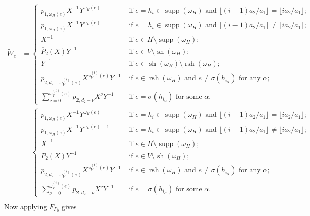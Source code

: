 \documentclass{amsart}
\newcommand{\supp}{\operatorname{supp}}
\newcommand{\rsh}{\operatorname{rsh}}
\newcommand{\sh}{\operatorname{sh}}
\begin{document}
\begin{align*}
 \tilde W_e
 &=\begin{cases}p_{1,\omega_H(e)}X^{-1}Y^{\omega_H(e)} & \text{ if $e=h_i\in\supp(\omega_H)$ and $\lfloor (i-1)a_2/a_1\rfloor=\lfloor ia_2/a_1\rfloor$;}\\ p_{1,\omega_H(e)}X^{-1}Y^{\omega_H(e)} & \text{ if $e=h_i\in\supp(\omega_H)$ and $\lfloor (i-1)a_2/a_1\rfloor\ne\lfloor ia_2/a_1\rfloor$;}\\ X^{-1} & \text{ if $e\in H\setminus\supp(\omega_H)$;}\\ \overline{P}_2(X)Y^{-1} & \text{ if $e\in V\setminus\sh(\omega_H);$}\\ Y^{-1} & \text{ if $e\in\sh(\omega_H)\setminus\rsh(\omega_H)$;}\\ p_{2,d_2-\omega_V^{(t)}(e)}X^{\omega_V^{(t)}(e)}Y^{-1} & \text{ if $e\in\rsh(\omega_H)$ and $e\ne\sigma(h_{i_\alpha})$ for any $\alpha$;}\\ \sum\limits_{\nu=0}^{\omega_V^{(t)}(e)}p_{2,d_2-\nu}X^\nu Y^{-1} & \text{ if $e=\sigma(h_{i_\alpha})$ for some $\alpha$.}\end{cases}\\
 &=\begin{cases}p_{1,\omega_H(e)}X^{-1}Y^{\omega_H(e)} & \text{ if $e=h_i\in\supp(\omega_H)$ and $\lfloor (i-1)a_2/a_1\rfloor=\lfloor ia_2/a_1\rfloor$;}\\ p_{1,\omega_H(e)}X^{-1}Y^{\omega_H(e)-1} & \text{ if $e=h_i\in\supp(\omega_H)$ and $\lfloor (i-1)a_2/a_1\rfloor\ne\lfloor ia_2/a_1\rfloor$;}\\ X^{-1} & \text{ if $e\in H\setminus\supp(\omega_H)$;}\\ \overline{P}_2(X)Y^{-1} & \text{ if $e\in V\setminus\sh(\omega_H);$}\\ p_{2,d_2-\omega_V^{(t)}(e)}X^{\omega_V^{(t)}(e)}Y^{-1} & \text{ if $e\in\rsh(\omega_H)$ and $e\ne\sigma(h_{i_\alpha})$ for any $\alpha$;}\\ \sum\limits_{\nu=0}^{\omega_V^{(t)}(e)}p_{2,d_2-\nu}X^\nu Y^{-1} & \text{ if $e=\sigma(h_{i_\alpha})$ for some $\alpha$.}\end{cases}\\
\end{align*}
Now applying $F_{P_0}$ gives
\end{document}
